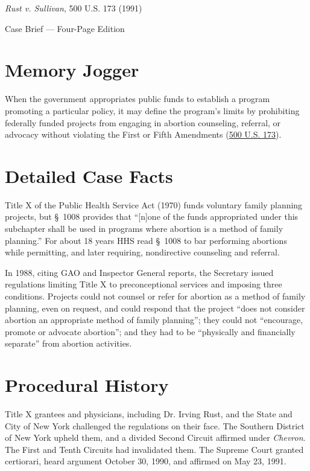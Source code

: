 \documentclass[12pt]{article}
\begin{document}
\begin{center}
{\LARGE \textit{Rust v. Sullivan}, 500 U.S. 173 (1991)\par}
\vspace{0.8em}
{\large Case Brief --- Four-Page Edition\par}
\end{center}
\vspace{1em}

\section{Memory Jogger}

When the government appropriates public funds to establish a program promoting a particular policy, it may define the program's limits by prohibiting federally funded projects from engaging in abortion counseling, referral, or advocacy without violating the First or Fifth Amendments (\href{https://supreme.justia.com/cases/federal/us/500/173/}{500 U.S. 173}).

\section{Detailed Case Facts}

Title X of the Public Health Service Act (1970) funds voluntary family planning projects, but \S~1008 provides that ``[n]one of the funds appropriated under this subchapter shall be used in programs where abortion is a method of family planning.'' For about 18 years HHS read \S~1008 to bar performing abortions while permitting, and later requiring, nondirective counseling and referral.

In 1988, citing GAO and Inspector General reports, the Secretary issued regulations limiting Title X to preconceptional services and imposing three conditions. Projects could not counsel or refer for abortion as a method of family planning, even on request, and could respond that the project ``does not consider abortion an appropriate method of family planning''; they could not ``encourage, promote or advocate abortion''; and they had to be ``physically and financially separate'' from abortion activities.

\section{Procedural History}

Title X grantees and physicians, including Dr. Irving Rust, and the State and City of New York challenged the regulations on their face. The Southern District of New York upheld them, and a divided Second Circuit affirmed under \textit{Chevron}. The First and Tenth Circuits had invalidated them. The Supreme Court granted certiorari, heard argument October 30, 1990, and affirmed on May 23, 1991.
\end{document}

